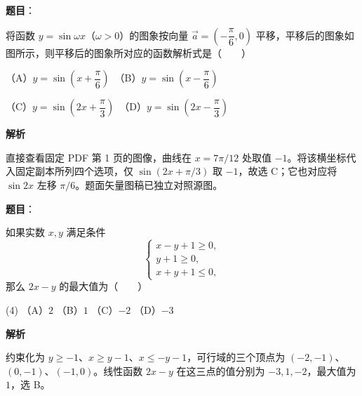 \begin{answer}

\textbf{题目}：

将函数 $y=\sin\omega x$（$\omega>0$）的图象按向量 $\vec a=\left(-\dfrac\pi6,0\right)$ 平移，平移后的图象如图所示，则平移后的图象所对应的函数解析式是\mbox{（　　）}

（A）$y=\sin\left(x+\dfrac\pi6\right)$　（B）$y=\sin\left(x-\dfrac\pi6\right)$

（C）$y=\sin\left(2x+\dfrac\pi3\right)$　（D）$y=\sin\left(2x-\dfrac\pi3\right)$
\nopagebreak[4]
\begin{center}\end{center}
\nopagebreak[4]
\textbf{解析}

直接查看固定 PDF 第 1 页的图像，曲线在 $x=7\pi/12$ 处取值 $-1$。将该横坐标代入固定副本所列四个选项，仅 $\sin(2x+\pi/3)$ 取 $-1$，故选 C；它也对应将 $\sin 2x$ 左移 $\pi/6$。题面矢量图稿已独立对照源图。


\end{answer}
\begin{answer}

\textbf{题目}：

如果实数 $x,y$ 满足条件
\nopagebreak[4]
\[
\begin{cases}
x-y+1\geqslant0,\\
y+1\geqslant0,\\
x+y+1\leqslant0,
\end{cases}
\]
那么 $2x-y$ 的最大值为\mbox{（　　）}

\begin{gkopts}(4)
\task （A）$2$
\task （B）$1$
\task （C）$-2$
\task （D）$-3$
\end{gkopts}

\textbf{解析}

约束化为 $y\ge-1$、$x\ge y-1$、$x\le-y-1$，可行域的三个顶点为 $(-2,-1)$、$(0,-1)$、$(-1,0)$。线性函数 $2x-y$ 在这三点的值分别为 $-3,1,-2$，最大值为 $1$，选 B。


\end{answer}
